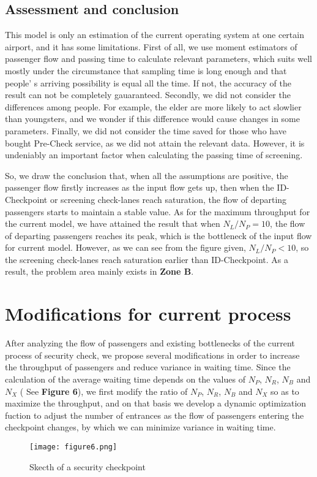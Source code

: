 \documentclass{mcmthesis}
\begin{document}
\subsection{Assessment and conclusion}
This model is only an estimation of the current operating system at one certain airport, and it has some limitations. First of all, we use moment estimators of passenger flow and passing time to calculate relevant parameters, which suits well mostly under the circumstance that sampling time is long enough and that people' s  arriving possibility is equal all the time. If not, the accuracy of the result can not be completely gauaranteed. Secondly, we did not consider the differences among people. For example, the elder are more likely to act slowlier than youngsters, and we wonder if this difference would cause changes in some parameters. Finally, we did not consider the time saved for those who have bought Pre-Check service, as we did not attain the relevant data. However, it is undeniably an important factor when calculating the passing time of screening.

So, we draw the conclusion that, when all the assumptions are positive, the passenger flow firstly increases as the input flow gets up, then when the ID-Checkpoint or screening check-lanes reach saturation, the flow of departing passengers starts to maintain a stable value. As for the maximum throughput for the current model, we have attained the result that when $N_L/N_P=10$, the flow of departing passengers reaches its peak, which is the bottleneck of the input flow for current model. However, as we can see from the figure given, $N_L/N_P<10$, so the screening check-lanes reach saturation earlier than ID-Checkpoint. As a result, the problem area mainly exists in \textbf{Zone B}.

\section{Modifications for current process}
After analyzing the flow of passengers and existing bottlenecks of the current process of security check, we propose several modifications in order to increase the throughput of passengers and reduce variance in waiting time. Since the calculation of the average waiting time depends on the values of $N_P$, $N_R$, $N_B$ and $N_X$ ( See \textbf{Figure 6}), we first modify the ratio of $N_P$, $N_R$, $N_B$ and $N_X$ so as to maximize the throughput, and on that basis we develop a dynamic optimization fuction to adjust the number of entrances as the flow of passengers entering the checkpoint changes, by which we can minimize variance in waiting time.  
\begin{figure}[h]
\small
\centering
\texttt{[image: figure6.png]}
\caption{Skecth of a security checkpoint} \label{fig:Skecth of a security checkpoint}
\end{figure}
\end{document}
